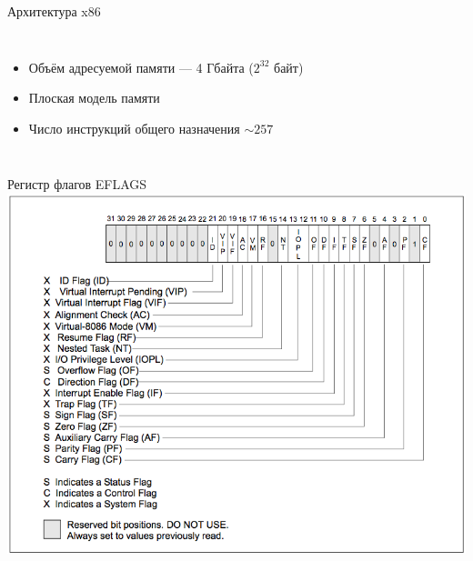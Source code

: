 \documentclass{beamer}
\begin{document}
\begin{frame}{Архитектура x86}
\begin{columns}
\begin{itemize}
            \begin{itemize}
                \item {\bf EAX} --- аккумулятор
                \item {\bf EBX} --- адрес данных
                \item {\bf ECX} --- счётчик циклов
                \item {\bf EDX} --- для хранения данных
                \item {\bf ESI} --- адрес источника
                \item {\bf EDI} --- адрес приёмника
                \item {\bf EBP} --- указатель на данные в стеке
                \item {\bf ESP} --- указатель на вершину стека
                \item {\bf EIP} --- счётчик команд
                \item {\bf EFLAGS} --- регистр флагов
            \end{itemize}
            \item Объём адресуемой памяти --- 4 Гбайта ($2^{32}$ байт)
            \item Плоская модель памяти
            \item Число инструкций общего назначения $\sim 257$
        \end{itemize}
        \end{columns}
    \end{frame}
    \begin{frame}{Регистр флагов EFLAGS}
    \includegraphics[width=0.9\linewidth]{fig/EFLAGS.png}
    \end{frame}
\end{document}
